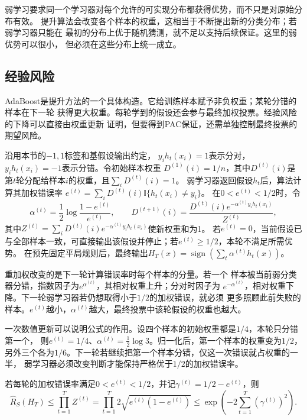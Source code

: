 弱学习要求同一个学习器对每个允许的可实现分布都获得优势，而不只是对原始分布有效。
提升算法会改变各个样本的权重，这相当于不断提出新的分类分布；若弱学习器只能在
最初的分布上优于随机猜测，就不足以支持后续保证。这里的弱优势可以很小，
但必须在这些分布上统一成立。

\subsection{经验风险}

AdaBoost是提升方法的一个具体构造。它给训练样本赋予非负权重；某轮分错的样本在下一轮
获得更大权重。每轮学到的假设还会参与最终加权投票。经验风险的下降可以直接由权重更新
证明，但要得到PAC保证，还需单独控制最终投票的期望风险。

沿用本节的$-1,1$标签和基假设输出约定，
$y_i h_t(x_i)=1$表示分对，$y_i h_t(x_i)=-1$表示分错。令初始样本权重
$D^{(1)}(i)=1/n$，其中$D^{(t)}(i)$是第$t$轮分配给样本$i$的权重，且$\sum_iD^{(t)}(i)=1$。
弱学习器返回假设$h_t$后，算法计算其加权错误率
$e^{(t)}=\sum_iD^{(t)}(i)\mathbb I\{h_t(x_i)\neq y_i\}$。
在$0<e^{(t)}<1/2$时，令
\begin{equation}
 \alpha^{(t)}=\frac12\log\frac{1-e^{(t)}}{e^{(t)}},\qquad
 D^{(t+1)}(i)=\frac{D^{(t)}(i)e^{-\alpha^{(t)} y_i h_t(x_i)}}{Z^{(t)}},
 \label{eq:adaboost-update}
\end{equation}
其中$Z^{(t)}=\sum_iD^{(t)}(i)e^{-\alpha^{(t)} y_i h_t(x_i)}$使新权重和为1。
若$e^{(t)}=0$，当前假设已与全部样本一致，可直接输出该假设并停止；若$e^{(t)}\geq1/2$，本轮不满足所需优势。
在预先固定平局规则后，最终输出$H_T(x)=\operatorname{sign}(\sum_t\alpha^{(t)} h_t(x))$。

重加权改变的是下一轮计算错误率时每个样本的分量。若一个
样本被当前弱分类器分错，指数因子为$e^{\alpha^{(t)}}$，其相对权重上升；分对时因子为
$e^{-\alpha^{(t)}}$，相对权重下降。下一轮弱学习器若仍想取得小于$1/2$的加权错误，就必须
更多照顾此前失败的样本。$e^{(t)}$越小，$\alpha^{(t)}$越大，最终投票中该轮假设的权重也越大。

一次数值更新可以说明公式的作用。设四个样本的初始权重都是$1/4$，本轮只分错第一个，
则$e^{(t)}=1/4$、$\alpha^{(t)}=\tfrac12\log3$。归一化后，第一个样本的权重变为$1/2$，
另外三个各为$1/6$。下一轮若继续把第一个样本分错，仅这一次错误就占权重的一半，
弱学习器必须改变判断才能保持严格优于$1/2$的加权错误率。

\begin{theorem}[AdaBoost经验风险界]
\label{thm:adaboost-training-error}
若每轮的加权错误率满足$0<e^{(t)}<1/2$，并记$\gamma^{(t)}=1/2-e^{(t)}$，则
\begin{equation}
 \hat R_S(H_T)\leq\prod_{t=1}^T Z^{(t)}
 =\prod_{t=1}^T2\sqrt{e^{(t)}(1-e^{(t)})}
 \leq\exp\left(-2\sum_{t=1}^T(\gamma^{(t)})^2\right).
 \label{eq:adaboost-training-bound}
\end{equation}
\end{theorem}

